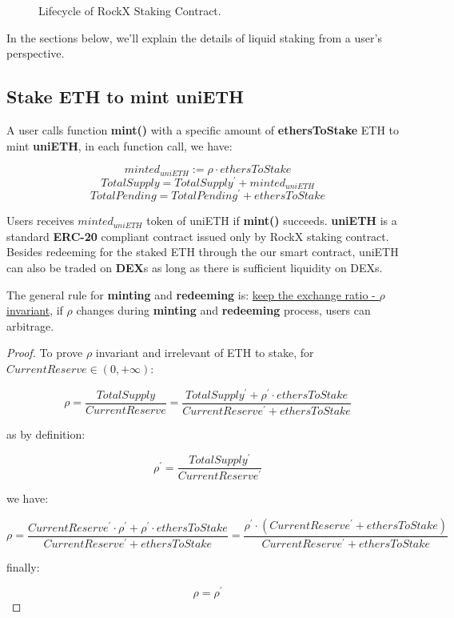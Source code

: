 \documentclass{article}
\begin{document}
\begin{figure}
\begin{center}
\end{center}
\caption{Lifecycle of RockX Staking Contract.}
\end{figure}

In the sections below, we'll explain the details of liquid staking from a user's perspective.

\subsection{Stake ETH to mint uniETH}
A user calls function \textbf{mint()} with a specific amount of \textbf{ethersToStake} ETH to mint \textbf{uniETH}, in each function call, we have:

\begin{theorem}
\label{Mint}
\[minted_{uniETH} := \rho \cdot ethersToStake \]
\[TotalSupply = TotalSupply^{\prime} + minted_{uniETH} \]
\[TotalPending = TotalPending^{\prime} + ethersToStake\]
\end{theorem}

Users receives \underline{$minted_{uniETH}$} token of uniETH  if \textbf{mint()} succeeds. \textbf{uniETH} is a standard \textbf{ERC-20} compliant contract issued only by RockX staking contract. Besides redeeming for the staked ETH through the our smart contract, uniETH can also be traded on \textbf{DEX}s as long as there is sufficient liquidity on DEXs.

The general rule for \textbf{minting} and \textbf{redeeming} is: \underline{keep the exchange ratio - $\rho$ invariant}, if $\rho$ changes during \textbf{minting} and \textbf{redeeming} process, users can arbitrage.

\begin{proof}
To prove $\rho$ invariant and irrelevant of ETH to stake, for $CurrentReserve \in (0, +\infty)$:

\[\rho = \frac{TotalSupply}{CurrentReserve} = \frac{TotalSupply^{\prime} + \rho^{\prime} \cdot ethersToStake}{CurrentReserve^{\prime} + ethersToStake}\]

as by definition:

\[\rho^{\prime} = \frac{TotalSupply^{\prime}}{CurrentReserve^{\prime}}\]

we have:

\[\rho=\frac{CurrentReserve^{\prime} \cdot \rho^{\prime}  + \rho^{\prime} \cdot ethersToStake}{CurrentReserve^{\prime} + ethersToStake} = \frac{\rho^{\prime} \cdot (CurrentReserve^{\prime} + ethersToStake)}{CurrentReserve^{\prime} + ethersToStake} \]

finally:

\[\rho = \rho^{\prime}\]

\end{proof}
\end{document}
